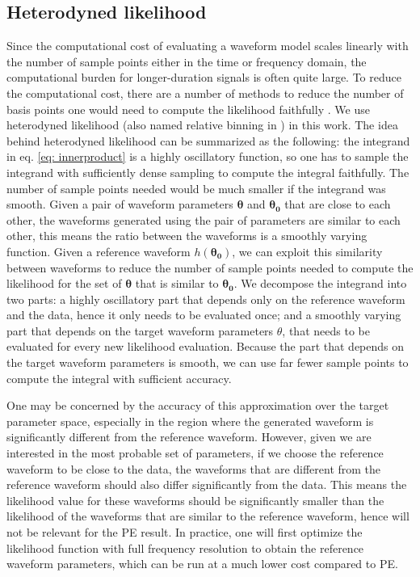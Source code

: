 \documentclass[twocolumn]{aastex631}
\begin{document}
\subsection{Heterodyned likelihood}

Since the computational cost of evaluating a waveform model scales linearly with
the number of sample points either in the time or frequency domain, the
computational burden for longer-duration signals is often quite large. To reduce
the computational cost, there are a number of methods to reduce the number of
basis points one would need to compute the likelihood faithfully
\cite{Field:2011mf, Field:2013cfa, Smith:2016qas, Vinciguerra:2017ngf}. We use
heterodyned likelihood \cite{Cornish:2021lje} (also named relative binning in
\cite{Zackay:2018qdy}) in this work. The idea behind heterodyned likelihood can
be summarized as the following: the integrand in eq. \ref{eq: innerproduct} is a
highly oscillatory function, so one has to sample the integrand with
sufficiently dense sampling to compute the integral faithfully. The number of
sample points needed would be much smaller if the integrand was smooth. Given a
pair of waveform parameters $\mathbf{\theta}$ and $\mathbf{\theta_0}$ that are
close to each other, the waveforms generated using the pair of parameters are
similar to each other, this means the ratio between the waveforms is a smoothly
varying function. Given a reference waveform $h(\mathbf{\theta_0})$, we can
exploit this similarity between waveforms to reduce the number of sample points
needed to compute the likelihood for the set of $\mathbf{\theta}$ that is
similar to $\mathbf{\theta_0}$. We decompose the integrand into two parts: a
highly oscillatory part that depends only on the reference waveform and the
data, hence it only needs to be evaluated once; and a smoothly varying part that
depends on the target waveform parameters $\theta$, that needs to be evaluated
for every new likelihood evaluation. Because the part that depends on the target
waveform parameters is smooth, we can use far fewer sample points to compute the
integral with sufficient accuracy.

One may be concerned by the accuracy of this approximation over the target
parameter space, especially in the region where the generated waveform is
significantly different from the reference waveform. However, given we are
interested in the most probable set of parameters, if we choose the reference
waveform to be close to the data, the waveforms that are different from the
reference waveform should also differ significantly from the data. This means
the likelihood value for these waveforms should be significantly smaller than
the likelihood of the waveforms that are similar to the reference waveform,
hence will not be relevant for the PE result. In practice, one will first
optimize the likelihood function with full frequency resolution to obtain the
reference waveform parameters, which can be run at a much lower cost compared to
PE. 
\end{document}
